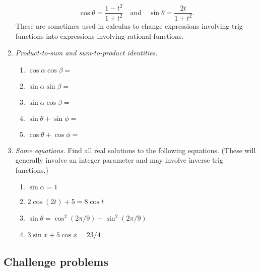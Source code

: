 \begin{enumerate}
\begin{equation*}
\cos\theta = \frac{1 - t^2}{1 + t^2}\quad\text{and}\quad\sin\theta = \frac{2t}{1 + t^2}.
\end{equation*}
These are sometimes used in calculus to change expressions involving trig functions into expressions involving rational functions.
\item \emph{Product-to-sum and sum-to-product identities.}
\begin{enumerate}
\item $\cos\alpha\cos\beta = $
\item $\sin\alpha\sin\beta = $
\item $\sin\alpha\cos\beta = $
\item $\sin\theta + \sin\phi = $
\item $\cos\theta + \cos\phi = $
\end{enumerate}
\item \emph{Some equations.} Find all real solutions to the following equations. (These will generally involve an integer parameter and may involve inverse trig functions.) %
\begin{enumerate}
\item $\sin\alpha = 1$
\item $2\cos(2t) + 5 = 8\cos t$
\item $\sin\theta = \cos^2(2\pi/9) - \sin^2(2\pi/9)$
\item $3\sin x + 5\cos x = 23/4$
\end{enumerate}
\end{enumerate}


\subsection{Challenge problems}

